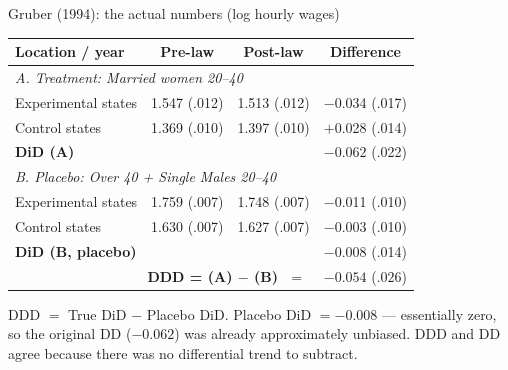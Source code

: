 \documentclass[aspectratio=169,11pt]{beamer}
\begin{document}

\begin{frame}{Gruber (1994): the actual numbers (log hourly wages)}
\begin{center}
\renewcommand{\arraystretch}{1.0}
\scriptsize
\begin{tabular}{@{}lccc@{}}
\toprule
\textbf{Location / year}                 & \textbf{Pre-law} & \textbf{Post-law} & \textbf{Difference} \\
\midrule
\multicolumn{4}{l}{\textit{A. Treatment: Married women 20--40}} \\
\;\;Experimental states                  & 1.547 (.012)     & 1.513 (.012)      & $-$0.034 (.017) \\
\;\;Control states                       & 1.369 (.010)     & 1.397 (.010)      & $+$0.028 (.014) \\
\;\;\textbf{DiD (A)}                     &                  &                   & \cellcolor{remixgreenlight}$\mathbf{-0.062}$ (.022) \\
\midrule
\multicolumn{4}{l}{\textit{B. Placebo: Over 40 + Single Males 20--40}} \\
\;\;Experimental states                  & 1.759 (.007)     & 1.748 (.007)      & $-$0.011 (.010) \\
\;\;Control states                       & 1.630 (.007)     & 1.627 (.007)      & $-$0.003 (.010) \\
\;\;\textbf{DiD (B, placebo)}            &                  &                   & \cellcolor{remixgreenlight}$\mathbf{-0.008}$ (.014) \\
\midrule
\multicolumn{3}{r}{\textbf{DDD = (A) $-$ (B) $\;=\;$}} & \cellcolor{remixgreenlight}$\mathbf{-0.054}$ (.026) \\
\bottomrule
\end{tabular}
\end{center}
\vspace{0.3em}
{\footnotesize DDD $=$ True DiD $-$ Placebo DiD. Placebo DiD $= -0.008$ --- essentially zero, so the original DD ($-0.062$) was already approximately unbiased. DDD and DD agree because there was no differential trend to subtract.}
\end{frame}
\end{document}
